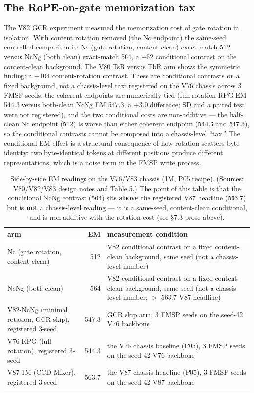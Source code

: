 \documentclass[11pt]{article}
\begin{document}
\subsection{The RoPE-on-gate memorization tax}

The V82 GCR experiment measured the memorization cost of gate rotation in isolation. With content rotation removed (the Nc endpoint) the same-seed controlled comparison is: Nc (gate rotation, content clean) exact-match 512 versus NcNg (both clean) exact-match 564, a +52 conditional contrast on the content-clean background. The V80 TsR versus TbR arm shows the symmetric finding: a +104 content-rotation contrast. These are conditional contrasts on a fixed background, not a chassis-level tax: registered on the V76 chassis across 3 FMSP seeds, the coherent endpoints are numerically tied (full rotation RPG EM 544.3 versus both-clean NcNg EM 547.3, a +3.0 difference; SD and a paired test were not registered), and the two conditional costs are non-additive --- the half-clean Nc endpoint (512) is worse than either coherent endpoint (544.3 and 547.3), so the conditional contrasts cannot be composed into a chassis-level ``tax.'' The conditional EM effect is a structural consequence of how rotation scatters byte-identity: two byte-identical tokens at different positions produce different representations, which is a noise term in the FMSP write process.

\begin{table}[!t]
\small
\caption{Side-by-side EM readings on the V76/V83 chassis (1M, P05 recipe). (Sources: V80/V82/V83 design notes and Table 5.) The point of this table is that the conditional NcNg contrast (564) sits \textbf{above} the registered V87 headline (563.7) but is \textbf{not} a chassis-level reading --- it is a same-seed, content-clean conditional, and is non-additive with the rotation cost (see \S7.3 prose above).}
\label{tab:side-by-side-em}
\centering
\begin{tabular}{p{4.2cm}rp{8.6cm}}
\toprule
arm & EM & measurement condition \\
\midrule
Nc (gate rotation, content clean) & 512 & V82 conditional contrast on a fixed content-clean background, same seed (not a chassis-level number) \\
NcNg (both clean) & 564 & V82 conditional contrast on a fixed content-clean background, same seed (not a chassis-level number; $>$ 563.7 V87 headline) \\
V82-NcNg (minimal rotation, GCR skip), registered 3-seed & 547.3 & GCR skip arm, 3 FMSP seeds on the seed-42 V76 backbone \\
V76-RPG (full rotation), registered 3-seed & 544.3 & the V76 chassis baseline (P05), 3 FMSP seeds on the seed-42 V76 backbone \\
V87-1M (CCD-Mixer), registered 3-seed & 563.7 & the V87 chassis headline (P05), 3 FMSP seeds on the seed-42 V87 backbone \\
\bottomrule
\end{tabular}
\end{table}
\end{document}

